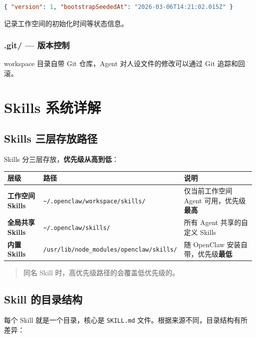 \begin{lstlisting}[language=json]
{ "version": 1, "bootstrapSeededAt": "2026-03-06T14:21:02.015Z" }
\end{lstlisting}

记录工作空间的初始化时间等状态信息。

\subsubsection{.git/ --- 版本控制}


workspace 目录自带 Git 仓库，Agent 对人设文件的修改可以通过 Git 追踪和回滚。

\hrulefill

\section{Skills 系统详解}


\subsection{Skills 三层存放路径}


Skills 分三层存放，\textbf{优先级从高到低}：

\begin{table}[h]
\centering
\small
\begin{tabular}{|l|l|l|}
\hline
层级 & 路径 & 说明 \\
\hline
\textbf{工作空间 Skills} & \texttt{\textasciitilde{}/.openclaw/workspace/skills/} & 仅当前工作空间 Agent 可用，优先级\textbf{最高} \\
\hline
\textbf{全局共享 Skills} & \texttt{\textasciitilde{}/.openclaw/skills/} & 所有 Agent 共享的自定义 Skills \\
\hline
\textbf{内置 Skills} & \texttt{/usr/lib/node\_modules/openclaw/skills/} & 随 OpenClaw 安装自带，优先级\textbf{最低} \\
\hline
\end{tabular}
\end{table}

\begin{quote}
同名 Skill 时，高优先级路径的会覆盖低优先级的。
\end{quote}

\subsection{Skill 的目录结构}


每个 Skill 就是一个目录，核心是 \texttt{SKILL.md} 文件。根据来源不同，目录结构有所差异：

